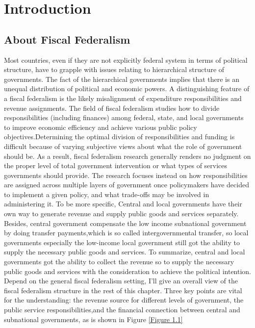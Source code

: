 
\chapter{Introduction} \label{chapter1:Introduction}

\section{About Fiscal Federalism}
Most countries, even if they are not explicitly federal system in terms of political structure, have to grapple with issues relating to hierarchical structure of governments. The fact of the hierarchical governments implies that there is an unequal distribution of political and economic powers. A distinguishing feature of a fiscal federalism is the likely misalignment of expenditure responsibilities and revenue assignments. The field of fiscal federalism studies how to divide responsibilities (including finances) among federal, state, and local governments to improve economic efficiency and achieve various public policy objectives.Determining the optimal division of responsibilities and funding is difficult because of varying subjective views about what the role of government should be. As a result, fiscal federalism research generally renders no judgment on the proper level of total government intervention or what types of services governments should provide. The research focuses instead on how responsibilities are assigned across multiple layers of government once policymakers have decided to implement a given policy, and what trade-offs may be involved in administering it. To be more specific, Central and local governments have their own way to generate revenue and supply public goods and services separately. Besides, central government compensate the low income subnational government by doing transfer payments,which is so called intergovernmental transfer, so local governments especially the low-income local government still got the ability to supply the necessary public goods and services. To summarize, central and local governments got the ability to collect the revenue so to supply the necessary public goods and services with the consideration to achieve the political intention. Depend on the general fiscal federalism setting, I'll give an overall view of the fiscal federalism structure in the rest of this chapter. Three key points are vital for the understanding: the revenue source for different levels of government, the public service responsibilities,and the financial connection between central and subnational governments, as is shown in Figure \ref*{Figure 1.1}

